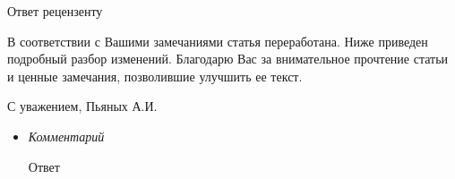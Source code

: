 \documentclass[12pt]{extarticle}
\begin{document}
\begin{center}
{\Large Ответ рецензенту}
\end{center}

В соответствии с Вашими замечаниями статья переработана. Ниже приведен подробный разбор изменений.
Благодарю Вас за внимательное прочтение статьи и ценные замечания, позволившие улучшить ее текст.

\begin{flushright}
С уважением, Пьяных А.И.
\end{flushright}


\begin{itemize}
\item%
  \textit{Комментарий}
  
  Ответ
\end{itemize}
\end{document}
